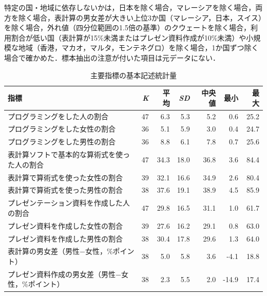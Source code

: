 \documentclass[a4paper,10pt,twocolumn]{ltjsarticle}
\begin{document}
特定の国・地域に依存しないかは，日本を除く場合，マレーシアを除く場合，両方を除く場合，表計算の男女差が大きい上位3か国（マレーシア，日本，スイス）を除く場合，外れ値（四分位範囲の1.5倍の基準）のクウェートを除く場合，利用割合が低い国（表計算が15\%未満またはプレゼン資料作成が10\%未満）や小規模な地域（香港，マカオ，マルタ，モンテネグロ）を除く場合，1か国ずつ除く場合で確かめた．標本抽出の注意が付いた項目は元データにない．
\begin{table}[!t]
\caption{主要指標の基本記述統計量}
\centering\small
\begin{tabular}{>{\raggedright\arraybackslash}p{9.2cm}rrrrrr}
\toprule
指標 & \textit{K} & 平均 & \textit{SD} & 中央値 & 最小 & 最大 \\
\midrule
プログラミングをした人の割合 & 47 & 6.3 & 5.3 & 5.2 & 0.6 & 25.2 \\
プログラミングをした女性の割合 & 36 & 5.1 & 5.9 & 3.0 & 0.4 & 24.7 \\
プログラミングをした男性の割合 & 36 & 8.8 & 6.1 & 7.8 & 0.7 & 25.6 \\
表計算ソフトで基本的な算術式を使った人の割合 & 47 & 34.3 & 18.0 & 36.8 & 3.6 & 84.4 \\
表計算で算術式を使った女性の割合 & 39 & 32.1 & 16.6 & 34.9 & 2.6 & 80.4 \\
表計算で算術式を使った男性の割合 & 38 & 37.6 & 19.1 & 38.9 & 4.5 & 85.9 \\
プレゼンテーション資料を作成した人の割合 & 47 & 29.8 & 16.5 & 31.1 & 1.0 & 61.7 \\
プレゼン資料を作成した女性の割合 & 39 & 27.6 & 16.2 & 29.1 & 0.8 & 63.0 \\
プレゼン資料を作成した男性の割合 & 38 & 30.4 & 17.8 & 29.6 & 1.3 & 64.0 \\
表計算の男女差（男性−女性，\%ポイント） & 38 & 5.0 & 5.8 & 3.6 & -4.1 & 18.8 \\
プレゼン資料作成の男女差（男性−女性，\%ポイント） & 38 & 2.3 & 5.5 & 2.0 & -14.9 & 17.4 \\
\bottomrule
\end{tabular}
\par{}
\end{table}
\end{document}

